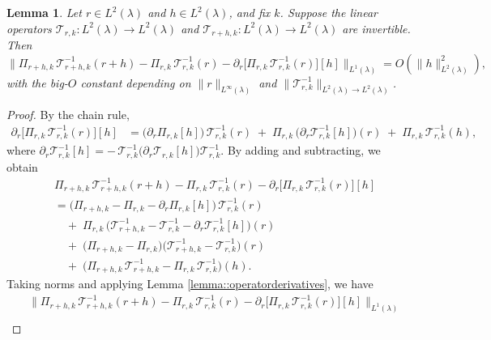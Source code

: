 \documentclass[11pt]{article}
\theoremstyle{plain}
\newtheorem{lemma}[theorem]{Lemma}
\begin{document}
 
\begin{lemma}
\label{lemma::valuestarderivativereward}
Let $r \in L^2(\lambda)$ and $h \in L^2(\lambda)$, and fix $k$.  
Suppose the linear operators $\mathcal{T}_{r,k}:L^2(\lambda) \to L^2(\lambda)$ 
and $\mathcal{T}_{r+h,k}:L^2(\lambda) \to L^2(\lambda)$ are invertible. Then
\[
\big\|\Pi_{r+h,k}\,\mathcal{T}_{r+h,k}^{-1}(r+h) 
 - \Pi_{r,k}\,\mathcal{T}_{r,k}^{-1}(r) 
 - \partial_r\!\big[\Pi_{r,k}\,\mathcal{T}_{r,k}^{-1}(r)\big][h]\big\|_{L^1(\lambda)} 
= O(\|h\|_{L^2(\lambda)}^2),
\]
with the big-$O$ constant depending on $\|r\|_{L^\infty(\lambda)}$ 
and $\|\mathcal{T}_{r,k}^{-1}\|_{L^2(\lambda)\to L^2(\lambda)}$.
\end{lemma}
\begin{proof}
By the chain rule,
\begin{align*}
\partial_r\!\big[\Pi_{r,k}\,\mathcal{T}_{r,k}^{-1}(r)\big][h]
&= \big(\partial_r \Pi_{r,k}[h]\big)\,\mathcal{T}_{r,k}^{-1}(r)
\;+\;\Pi_{r,k}\,\big(\partial_r \mathcal{T}_{r,k}^{-1}[h]\big)(r)
\;+\;\Pi_{r,k}\,\mathcal{T}_{r,k}^{-1}(h),
\end{align*}
where $\partial_r \mathcal{T}_{r,k}^{-1}[h] = -\,\mathcal{T}_{r,k}^{-1}\big(\partial_r \mathcal{T}_{r,k}[h]\big)\mathcal{T}_{r,k}^{-1}$.
By adding and subtracting, we obtain
\begin{align*}
&\Pi_{r+h,k}\,\mathcal{T}_{r+h,k}^{-1}(r+h) - \Pi_{r,k}\,\mathcal{T}_{r,k}^{-1}(r) - \partial_r\!\big[\Pi_{r,k}\,\mathcal{T}_{r,k}^{-1}(r)\big][h] \\
&= \big(\Pi_{r+h,k}-\Pi_{r,k}-\partial_r \Pi_{r,k}[h]\big)\,\mathcal{T}_{r,k}^{-1}(r) \\
&\quad+\;\Pi_{r,k}\,\big(\mathcal{T}_{r+h,k}^{-1}-\mathcal{T}_{r,k}^{-1}-\partial_r \mathcal{T}_{r,k}^{-1}[h]\big)(r) \\
&\quad+\;\big(\Pi_{r+h,k}-\Pi_{r,k}\big)\big(\mathcal{T}_{r+h,k}^{-1}-\mathcal{T}_{r,k}^{-1}\big)(r) \\
&\quad+\;\big(\Pi_{r+h,k}\,\mathcal{T}_{r+h,k}^{-1}-\Pi_{r,k}\,\mathcal{T}_{r,k}^{-1}\big)(h).
\end{align*}
Taking norms and applying Lemma \ref{lemma::operatorderivatives}, we have
\begin{align*}
& \big\|\Pi_{r+h,k}\,\mathcal{T}_{r+h,k}^{-1}(r+h) - \Pi_{r,k}\,\mathcal{T}_{r,k}^{-1}(r) - \partial_r\!\big[\Pi_{r,k}\,\mathcal{T}_{r,k}^{-1}(r)\big][h]\big\|_{L^1(\lambda)} \\

\end{align*}
\end{proof}
\end{document}
